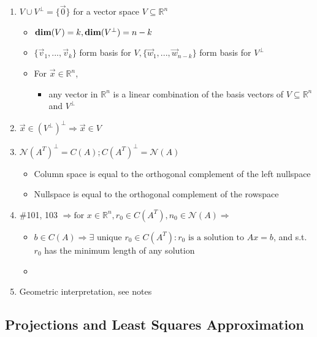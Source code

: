 \documentclass[10pt,letterpaper]{article}
\begin{document}
\begin{enumerate}
\item $V \cup V ^{\perp}= \{\vec 0\}$ for a vector space $V \subseteq \mathbb{R}^{n}$

\begin{itemize}
\item ${\bf dim} (V)= k, {\bf dim} (V ^{\perp} )= n-k$
\item $\{\vec{v}_1, ..., \vec{v}_k \}$ form basis for $V, \{\vec{w}_1, ..., \vec{w}_{n-k} \}$ form basis for $V ^{\perp}$
\item For $\vec{x} \in \mathbb{R}^{n}$, 

\begin{itemize}
\item any vector in $\mathbb{R}^{n}$ is a linear combination of the basis vectors of $V \subseteq \mathbb{R}^{n}$ and $V^\perp$
\end{itemize}

\end{itemize}

\item $\vec{x} \in (V ^{\perp})^{\perp} \Rightarrow \vec{x} \in V$
\item $\mathcal{N} (A ^{T}) ^{\perp} = C(A); C(A ^{T} )^{\perp} = \mathcal{N}(A)$

\begin{itemize}
\item Column space is equal to the orthogonal complement of the left nullspace
\item Nullspace is equal to the orthogonal complement of the rowspace
\end{itemize}

\item \#101, 103 $\Rightarrow \text{for } x \in \mathbb{R}^{n}, r_0 \in C(A ^{T} ), n_0 \in \mathcal{N}(A) \Rightarrow$ 

\begin{itemize}
\item $b \in C(A) \Rightarrow \exists \text{ unique } r_0 \in C(A ^{T}): r_0 \text{ is a solution to } Ax=b$, and s.t. $r_0$ has the minimum length of any solution
\item {}
\end{itemize}

\item Geometric interpretation, see notes
\end{enumerate}
\subsection{Projections and Least Squares Approximation}
\label{sec-1_8}
\end{document}
